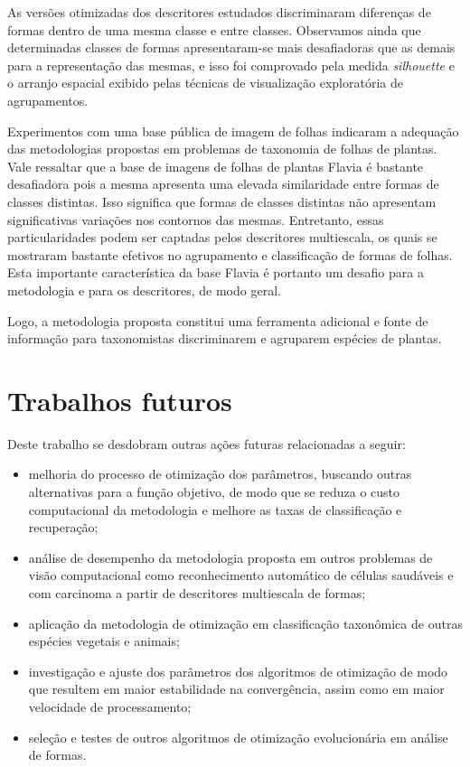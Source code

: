As versões otimizadas dos descritores estudados discriminaram diferenças de formas dentro de uma mesma classe e entre classes. Observamos ainda que determinadas classes de formas apresentaram-se mais desafiadoras que as demais para a representação das mesmas, e isso foi comprovado pela medida \textit{silhouette}  e o arranjo espacial exibido pelas técnicas de visualização exploratória de agrupamentos.

Experimentos com uma base pública de imagem de folhas indicaram a adequação das metodologias propostas em problemas de taxonomia de folhas de plantas. Vale ressaltar que a base de imagens de folhas de plantas Flavia é bastante desafiadora pois a mesma apresenta uma elevada similaridade entre formas de classes distintas. Isso significa que formas de classes distintas não apresentam significativas variações nos contornos das mesmas. Entretanto, essas particularidades podem ser captadas pelos descritores multiescala, os quais se mostraram bastante efetivos no agrupamento e classificação de formas de folhas.
Esta importante característica da base Flavia é portanto um desafio para a metodologia e  para os descritores, de modo geral. 

Logo, a metodologia proposta constitui uma ferramenta adicional e fonte de informação para taxonomistas discriminarem e agruparem espécies de plantas. 


\section*{Trabalhos futuros}
Deste trabalho se desdobram outras ações futuras relacionadas a seguir: 
\begin{itemize}

\item melhoria do processo de otimização dos parâmetros, buscando outras alternativas para a função objetivo, de modo que se reduza o custo computacional da metodologia e melhore as taxas de classificação e recuperação;

\item análise de desempenho da metodologia proposta em outros problemas de visão computacional como reconhecimento automático de células saudáveis e com carcinoma a partir de descritores multiescala de formas;

\item aplicação da metodologia de otimização em classificação taxonômica de outras espécies vegetais e animais;

\item investigação e ajuste dos parâmetros dos algoritmos de otimização de modo que resultem em maior estabilidade na convergência, assim como em maior velocidade de processamento;

\item seleção e testes de outros algoritmos de otimização evolucionária em análise  de formas.

\end{itemize}

